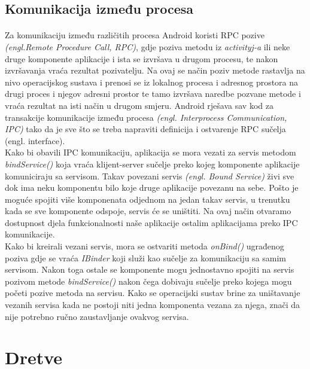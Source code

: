 \documentclass[times, utf8, zavrsni]{fer}
\begin{document}
\subsection{Komunikacija između procesa}
\paragraph{}
Za komunikaciju između različitih procesa Android koristi RPC pozive \textit{(engl.\linebreak Remote Procedure Call, RPC)}, gdje poziva metodu iz \textit{activityj-a} ili neke druge komponente aplikacije i ista se izvršava u drugom procesu, te nakon izvršavanja vraća rezultat pozivatelju. Na ovaj se način poziv metode rastavlja na nivo operacijskog sustava i prenosi se iz lokalnog procesa i adresnog prostora na drugi proces i njegov adresni prostor te tamo izvršava naredbe pozvane metode i vraća rezultat na isti način u drugom smjeru. Android rješava sav kod za transakcije komunikacije između procesa \textit{(engl. Interprocess Communication, IPC)} tako da je sve što se treba napraviti definicija i ostvarenje RPC sučelja (engl. interface).\\

Kako bi obavili IPC komunikaciju, aplikacija se mora vezati za servis metodom \textit{bindService()} koja vraća klijent-server sučelje preko kojeg komponente aplikacije komuniciraju sa servisom. Takav povezani servis \textit{(engl. Bound Service)} živi sve dok ima neku komponentu bilo koje druge aplikacije povezanu na sebe. Pošto je moguće spojiti više komponenata odjednom na jedan takav servis, u trenutku kada se sve komponente odspoje, servis će se uništiti. Na ovaj način otvaramo dostupnost djela funkcionalnosti naše aplikacije ostalim aplikacijama preko IPC komunikacije.\\

Kako bi kreirali vezani servis, mora se ostvariti metoda \textit{onBind()} ugrađenog poziva gdje se vraća \textit{IBinder} koji služi kao sučelje za komunikaciju sa samim servisom. Nakon toga ostale se komponente mogu jednostavno spojiti na servis pozivom metode \textit{bindService()} nakon čega dobivaju sučelje preko kojega mogu početi pozive metoda na servisu. Kako se operacijski sustav brine za uništavanje vezanih servisa kada ne postoji niti jedna komponenta vezana za njega, znači da nije potrebno ručno zaustavljanje ovakvog servisa.
 
\section{Dretve}
\end{document}
